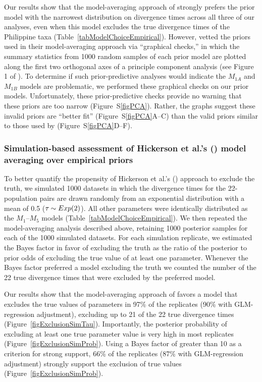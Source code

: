 Our results show that the model-averaging approach of \citet{Hickerson2013}
strongly prefers the prior model with the narrowest distribution on divergence
times across all three of our analyses, even when this model excludes the true
divergence times of the Philippine taxa
(Table~\ref{tabModelChoiceEmpirical}).
However, \citet{Hickerson2013} vetted the priors used in their model-averaging
approach via ``graphical checks,'' in which the summary statistics from 1000
random samples of each prior model are plotted along the first two orthogonal
axes of a principle component analysis (see Figure 1 of \citet{Hickerson2013}).
To determine if such prior-predictive analyses would indicate the $M_{1A}$ and
$M_{1B}$ models are problematic, we performed these graphical checks on our
prior models.
Unfortunately, these prior-predictive checks provide no warning that these
priors are too narrow (Figure~S\ref{figPCA}).
Rather, the graphs suggest these invalid priors are ``better fit''
(Figure~S\ref{figPCA}A--C) than the valid priors similar to those used by
\citet{Oaks2012} (Figure~S\ref{figPCA}D--F).


\subsubsection{Simulation-based assessment of Hickerson et al.'s
    (\citeyear{Hickerson2013}) model averaging over empirical priors}

To better quantify the propensity of Hickerson et al.'s
(\citeyear{Hickerson2013}) approach to exclude the truth, we simulated 1000
datasets in which the divergence times for the 22-population pairs are drawn
randomly from an exponential distribution with a mean of 0.5 ($\tau_{} \sim
Exp(2)$).
All other parameters were identically distributed as the $M_1$--$M_5$ models
(Table~\ref{tabModelChoiceEmpirical}).
We then repeated the model-averaging  analysis described above, retaining 1000
posterior samples for each of the 1000 simulated datasets.
For each simulation replicate, we estimated the Bayes factor in favor
of excluding the truth as the ratio of the posterior to prior odds of
excluding the true value of at least one parameter.
Whenever the Bayes factor preferred a model excluding the truth we counted the
number of the 22 true divergence times that were excluded by the preferred
model.

Our results show that the model-averaging approach of \citet{Hickerson2013}
favors a model that excludes the true values of parameters in 97\% of the
replicates (90\% with GLM-regression adjustment), excluding up to 21 of the 22
true divergence times (Figure~\ref{figExclusionSimTau}).
Importantly, the posterior probability of excluding at least one true parameter
value is very high in most replicates
(Figure~\ref{figExclusionSimProb}).
Using a Bayes factor of greater than 10 as a criterion for strong support, 66\%
of the replicates (87\% with GLM-regression adjustment) strongly support the
exclusion of true values (Figure~\ref{figExclusionSimProb}).

